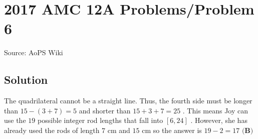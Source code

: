 \documentclass[12pt]{article}
\begin{document}
\section*{{2017 AMC 12A Problems/Problem 6}}
Source: AoPS Wiki

\subsection*{Solution}
The quadrilateral cannot be a straight line. Thus, the fourth side must be longer than $15 - (3 + 7) = 5$ and shorter than $15 + 3 + 7 = 25$ . This means Joy can use the $19$ possible integer rod lengths that fall into $[6, 24]$ . However, she has already used the rods of length $7$ cm and $15$ cm so the answer is $19 - 2 = 17$ $\boxed{\textbf{(B)}}$
\end{document}
